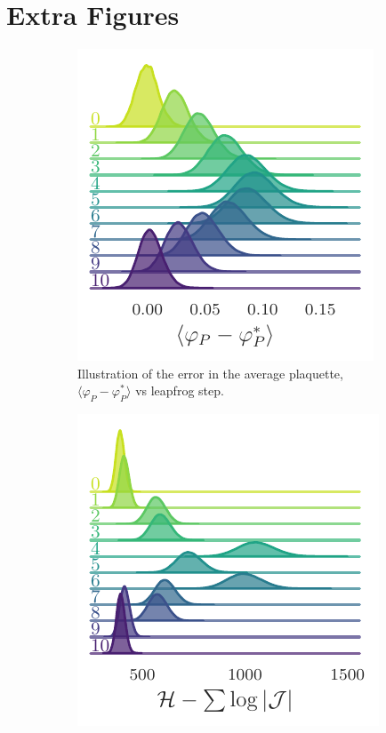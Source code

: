 \documentclass{article} %
\begin{document}
\section{\label{sec:extra_figures}Extra Figures}
\begin{figure}[htpb]
   \centering
   \begin{subfigure}{0.31\textwidth}
      \includegraphics[width=\textwidth]{figures/plaqsf.pdf}
      \caption{\label{fig:plaqsf}Illustration of the error in the average plaquette,
      \(\langle\varphi_{P}-\varphi_{P}^{*}\rangle\) vs leapfrog step.}
   \end{subfigure}
   \hfill
   \begin{subfigure}{0.31\textwidth}
      \includegraphics[width=\textwidth]{figures/hwf.pdf}

\end{subfigure}
\end{figure}
\end{document}
